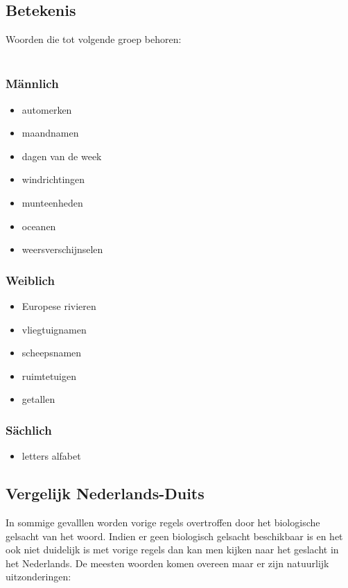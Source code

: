 \documentclass[main.tex]{subfiles}
\begin{document}
\subsection{Betekenis}
Woorden die tot volgende groep behoren:\\
\\
\begin{minipage}[t]{0,33\textwidth}
 \subsubsection{Männlich}
 \begin{itemize}
 \item automerken
 \item maandnamen
 \item dagen van de week
 \item windrichtingen
 \item munteenheden
 \item oceanen	
 \item weersverschijnselen
 \end{itemize}
\end{minipage}
\begin{minipage}[t]{0,33\textwidth}
 \subsubsection{Weiblich}
 \begin{itemize}
 \item Europese rivieren
 \item vliegtuignamen
 \item scheepsnamen
 \item ruimtetuigen
 \item getallen
 \end{itemize}
\end{minipage}
\begin{minipage}[t]{0,34\textwidth}
 \subsubsection{Sächlich}
 \begin{itemize}
 \item letters alfabet
 \end{itemize}
\end{minipage}
\subsection{Vergelijk Nederlands-Duits}
In sommige gevalllen worden vorige regels overtroffen door het biologische gelsacht van het woord. Indien er geen biologisch gelsacht beschikbaar is en het ook niet duidelijk is met vorige regels dan kan men kijken naar het geslacht in het Nederlands. De meesten woorden komen overeen maar er zijn natuurlijk uitzonderingen:\\
\end{document}
